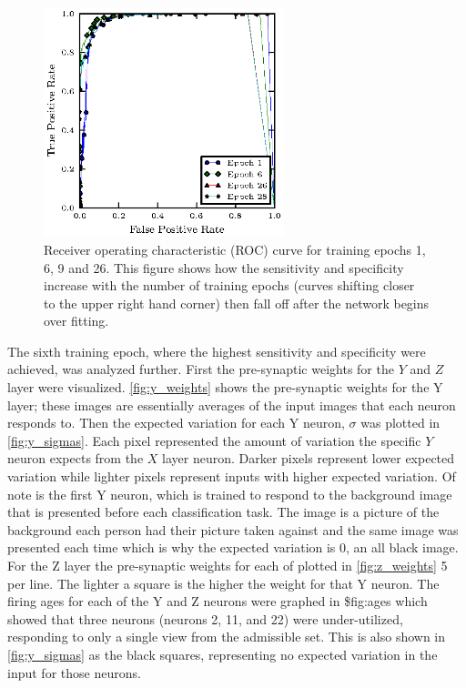 \documentclass[conference]{IEEEtran}
\begin{document}
\begin{figure}
\center
\fontsize{8}{12}\selectfont
\includegraphics[width=2.75in]{5_yneuron/roc.eps}
\caption{Receiver operating characteristic (ROC) curve for training epochs 1, 6, 9 and 26.  This figure shows how the sensitivity and specificity increase with the number of training epochs (curves shifting closer to the upper right hand corner) then fall off after the network begins over fitting.}
\label{fig:roc}
\end{figure}

The sixth training epoch, where the highest sensitivity and specificity were achieved, was analyzed further.  First the pre-synaptic weights for the $Y$ and $Z$ layer were visualized.  \ref{fig:y_weights} shows the pre-synaptic weights for the Y layer; these images are essentially averages of the input images that each neuron responds to.  Then the expected variation for each Y neuron, $\sigma$ was plotted in \ref{fig:y_sigmas}.  Each pixel represented the amount of variation the specific $Y$ neuron expects from the $X$ layer neuron.  Darker pixels represent lower expected variation while lighter pixels represent inputs with higher expected variation.  Of note is the first Y neuron, which is trained to respond to the background image that is presented before each classification task.  The image is a picture of the background each person had their picture taken against and the same image was presented each time which is why the expected variation is 0, an all black image.  For the Z layer the pre-synaptic weights for each of plotted in \ref{fig:z_weights} 5 per line. The lighter a square is the higher the weight for that Y neuron.  The firing ages for each of the Y and Z neurons were graphed in \${fig:ages} which showed that three neurons (neurons 2, 11, and 22) were under-utilized, responding to only a single view from the admissible set.  This is also shown in \ref{fig:y_sigmas} as the black squares, representing no expected variation in the input for those neurons.
\end{document}
